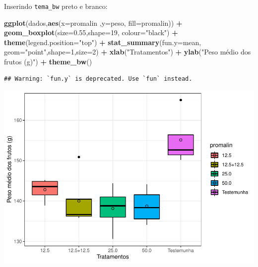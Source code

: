 \documentclass[
]{book}
\newenvironment{Shaded}{\begin{snugshade}}{\end{snugshade}}
\newcommand{\DataTypeTok}[1]{\textcolor[rgb]{0.13,0.29,0.53}{#1}}
\newcommand{\DecValTok}[1]{\textcolor[rgb]{0.00,0.00,0.81}{#1}}
\newcommand{\FloatTok}[1]{\textcolor[rgb]{0.00,0.00,0.81}{#1}}
\newcommand{\KeywordTok}[1]{\textcolor[rgb]{0.13,0.29,0.53}{\textbf{#1}}}
\newcommand{\NormalTok}[1]{#1}
\newcommand{\OperatorTok}[1]{\textcolor[rgb]{0.81,0.36,0.00}{\textbf{#1}}}
\newcommand{\StringTok}[1]{\textcolor[rgb]{0.31,0.60,0.02}{#1}}
\begin{document}
Inserindo \texttt{tema\_bw} preto e branco:

\begin{Shaded}
\begin{Highlighting}[]
\KeywordTok{ggplot}\NormalTok{(dados,}\KeywordTok{aes}\NormalTok{(}\DataTypeTok{x=}\NormalTok{promalin ,}\DataTypeTok{y=}\NormalTok{peso, }\DataTypeTok{fill=}\NormalTok{promalin)) }\OperatorTok{+}\StringTok{ }
\StringTok{      }\KeywordTok{geom_boxplot}\NormalTok{(}\DataTypeTok{size=}\FloatTok{0.55}\NormalTok{,}\DataTypeTok{shape=}\DecValTok{19}\NormalTok{, }\DataTypeTok{colour=}\StringTok{"black"}\NormalTok{) }\OperatorTok{+}\StringTok{ }
\StringTok{      }\KeywordTok{theme}\NormalTok{(}\DataTypeTok{legend.position=}\StringTok{"top"}\NormalTok{) }\OperatorTok{+}\StringTok{ }
\StringTok{      }\KeywordTok{stat_summary}\NormalTok{(}\DataTypeTok{fun.y=}\NormalTok{mean, }\DataTypeTok{geom=}\StringTok{"point"}\NormalTok{,}\DataTypeTok{shape=}\DecValTok{1}\NormalTok{,}\DataTypeTok{size=}\DecValTok{2}\NormalTok{) }\OperatorTok{+}\StringTok{ }
\StringTok{      }\KeywordTok{xlab}\NormalTok{(}\StringTok{"Tratamentos"}\NormalTok{) }\OperatorTok{+}\StringTok{  }
\StringTok{      }\KeywordTok{ylab}\NormalTok{(}\StringTok{"Peso médio dos frutos (g)"}\NormalTok{)  }\OperatorTok{+}
\StringTok{      }\KeywordTok{theme_bw}\NormalTok{() }
\end{Highlighting}
\end{Shaded}

\begin{verbatim}
## Warning: `fun.y` is deprecated. Use `fun` instead.
\end{verbatim}

\includegraphics{TudodoR_files/figure-latex/unnamed-chunk-237-1.pdf}
\end{document}
